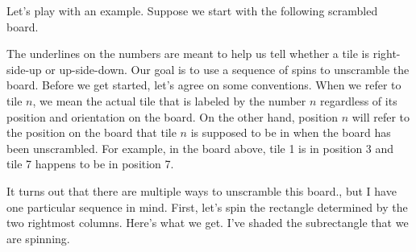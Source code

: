 \begin{example}\label{ex:spinpossible}
Let's play with an example.  Suppose we start with the following scrambled board.

\begin{center}
\end{center}

\noindent The underlines on the numbers are meant to help us tell whether a tile is right-side-up or up-side-down.  Our goal is to use a sequence of spins to unscramble the board.  Before we get started, let's agree on some conventions.  When we refer to tile $n$, we mean the actual tile that is labeled by the number $n$ regardless of its position and orientation on the board.  On the other hand, position $n$ will refer to the position on the board that tile $n$ is supposed to be in when the board has been unscrambled.  For example, in the board above, tile 1 is in position 3 and tile 7 happens to be in position 7.  

It turns out that there are multiple ways to unscramble this board., but I have one particular sequence in mind.  First, let's spin the rectangle determined by the two rightmost columns.  Here's what we get.  I've shaded the subrectangle that we are spinning.


\end{example}
